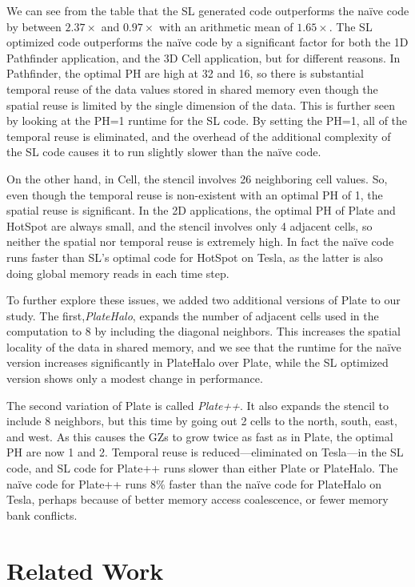 \documentclass{sig-alternate}
\begin{document}
We can see from the table that the SL generated code outperforms the
na\"{i}ve code by between $2.37\times$ and $0.97\times$ with an arithmetic
mean of $1.65\times$.  The SL optimized code outperforms the na\"{i}ve code
by a significant factor for both the 1D Pathfinder application, and the 3D
Cell application, but for different reasons.  In Pathfinder, the optimal PH
are high at 32 and 16, so there is substantial temporal reuse of the data
values stored in shared memory even though the spatial reuse is limited by
the single dimension of the data.  This is further seen by looking at the
PH=1 runtime for the SL code.  By setting the PH=1, all of the temporal reuse
is eliminated, and the overhead of the additional complexity of the SL code
causes it to run slightly slower than the na\"{i}ve code.

On the other hand, in Cell, the stencil involves 26 neighboring cell values.
So, even though the temporal reuse is non-existent with an optimal PH of 1,
the spatial reuse is significant.  In the 2D applications, the optimal PH of
Plate and HotSpot are always small, and the stencil involves only 4 adjacent
cells, so neither the spatial nor temporal reuse is extremely high.  In fact
the na\"{i}ve code runs faster than SL's optimal code for HotSpot on Tesla,
as the latter is also doing global memory reads in each time step.

To further explore these issues, we added two additional versions of Plate to
our study.  The first,{\em PlateHalo}, expands the number of adjacent cells
used in the computation to 8 by including the diagonal neighbors.  This
increases the spatial locality of the data in shared memory, and we see that
the runtime for the na\"{i}ve version increases significantly in PlateHalo
over Plate, while the SL optimized version shows only a modest change in
performance.

The second variation of Plate is called {\em Plate++}.  It also expands the
stencil to include 8 neighbors, but this time by going out 2 cells to the
north, south, east, and west.  As this causes the GZs to grow twice as fast
as in Plate, the optimal PH are now 1 and 2.  Temporal reuse is
reduced---eliminated on Tesla---in the SL code, and SL code for Plate++ runs
slower than either Plate or PlateHalo.  The na\"{i}ve code for Plate++ runs
8\% faster than the na\"{i}ve code for PlateHalo on Tesla, perhaps because of
better memory access coalescence, or fewer memory bank conflicts.

\section{Related Work}
\end{document}
